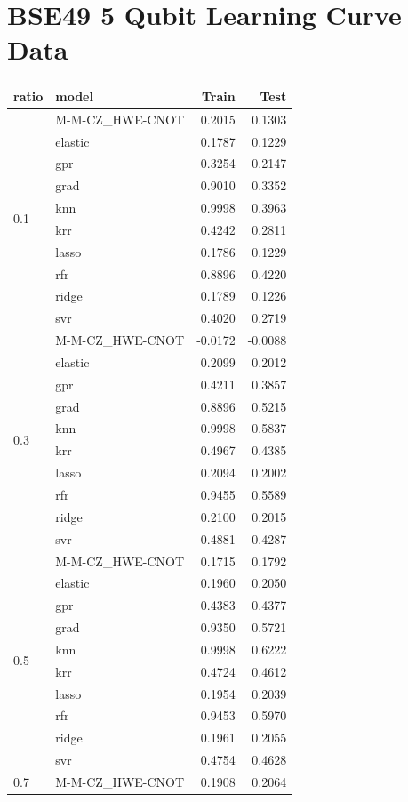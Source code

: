 \documentclass[journal=jacsat,manuscript=article]{achemso}
\begin{document}
\section{BSE49 5 Qubit Learning Curve Data}\label{section:5BSE49_LC_data}
\begin{longtable}{llrr}
\toprule
ratio & model &  Train & Test \\
\midrule
\multirow[t]{10}{*}{0.1} & M-M-CZ{\_}HWE-CNOT & 0.2015 & 0.1303 \\
& elastic & 0.1787 & 0.1229 \\
& gpr & 0.3254 & 0.2147 \\
& grad & 0.9010 & 0.3352 \\
& knn & 0.9998 & 0.3963 \\
& krr & 0.4242 & 0.2811 \\
& lasso & 0.1786 & 0.1229 \\
& rfr & 0.8896 & 0.4220 \\
& ridge & 0.1789 & 0.1226 \\
& svr & 0.4020 & 0.2719 \\
\cline{1-4}
\multirow[t]{10}{*}{0.3} & M-M-CZ{\_}HWE-CNOT & -0.0172 & -0.0088 \\
& elastic & 0.2099 & 0.2012 \\
& gpr & 0.4211 & 0.3857 \\
& grad & 0.8896 & 0.5215 \\
& knn & 0.9998 & 0.5837 \\
& krr & 0.4967 & 0.4385 \\
& lasso & 0.2094 & 0.2002 \\
& rfr & 0.9455 & 0.5589 \\
& ridge & 0.2100 & 0.2015 \\
& svr & 0.4881 & 0.4287 \\
\cline{1-4}
\multirow[t]{10}{*}{0.5} & M-M-CZ{\_}HWE-CNOT & 0.1715 & 0.1792 \\
& elastic & 0.1960 & 0.2050 \\
& gpr & 0.4383 & 0.4377 \\
& grad & 0.9350 & 0.5721 \\
& knn & 0.9998 & 0.6222 \\
& krr & 0.4724 & 0.4612 \\
& lasso & 0.1954 & 0.2039 \\
& rfr & 0.9453 & 0.5970 \\
& ridge & 0.1961 & 0.2055 \\
& svr & 0.4754 & 0.4628 \\
\cline{1-4}
\multirow[t]{10}{*}{0.7} & M-M-CZ{\_}HWE-CNOT & 0.1908 & 0.2064 \\

\end{longtable}
\end{document}
